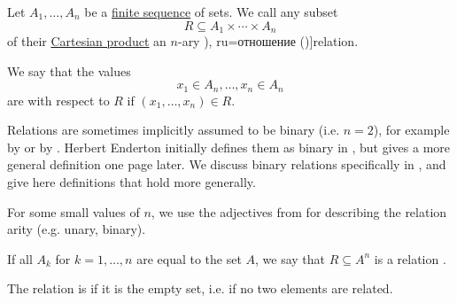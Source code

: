 \begin{definition}\label{def:relation}
  Let \( A_1, \ldots, A_n \) be a \hyperref[def:sequence]{finite sequence} of sets. We call any subset
  \begin{equation*}
    R \subseteq A_1 \times \cdots \times A_n
  \end{equation*}
  of their \hyperref[def:cartesian_product]{Cartesian product} an \( n \)-ary \term[bg=релация (\cite[367]{ГеновМиховскиМоллов1991Алгебра}), ru=отношение (\cite[25]{КолмогоровДрагалин2006Логика})]{relation}.

  We say that the values
  \begin{equation*}
    x_1 \in A_n, \ldots, x_n \in A_n
  \end{equation*}
  are  with respect to \( R \) if \( (x_1, \ldots, x_n) \in R \).

  Relations are sometimes implicitly assumed to be binary (i.e. \( n = 2 \)), for example by  or by . Herbert Enderton initially defines them as binary in , but gives a more general definition one page later. We discuss binary relations specifically in , and give here definitions that hold more generally.

  \begin{thmenum}[series=def:relation]
     For some small values of \( n \), we use the adjectives from  for describing the relation arity (e.g. unary, binary).

     If all \( A_k \) for \( k = 1, \ldots, n \) are equal to the set \( A \), we say that \( R \subseteq A^n \) is a relation .

     The relation is  if it is the empty set, i.e. if no two elements are related.
  \end{thmenum}
\end{definition}

